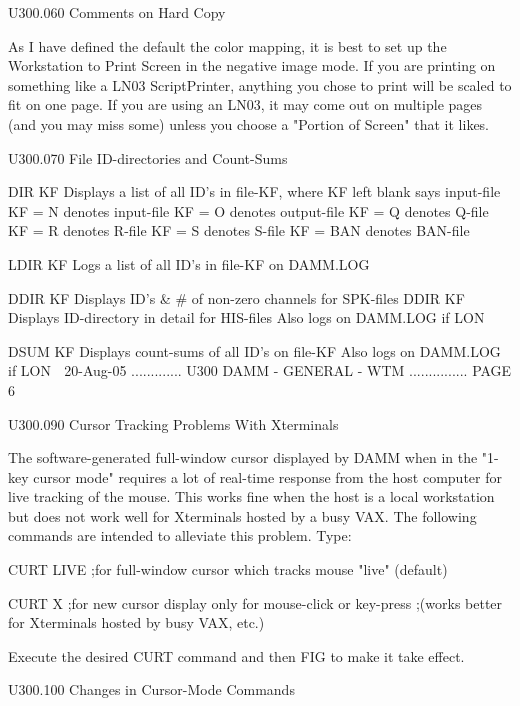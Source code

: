    U300.060  Comments on Hard Copy
 
   As I have defined the default the color mapping, it is best to set  up  the
   Workstation to Print Screen in the negative image mode. If you are printing
   on  something  like  a LN03 ScriptPrinter, anything you chose to print will
   be scaled to fit on one page. If you are using an LN03, it may come out  on
   multiple  pages  (and  you  may  miss some) unless you choose a "Portion of
   Screen" that it likes.
 
   U300.070  File ID-directories and Count-Sums
 
   DIR  KF   Displays a list of all ID's in file-KF, where
             KF   left blank says input-file
             KF = N     denotes   input-file
             KF = O     denotes  output-file
             KF = Q     denotes       Q-file
             KF = R     denotes       R-file
             KF = S     denotes       S-file
             KF = BAN   denotes     BAN-file
 
   LDIR KF   Logs a list of all ID's in file-KF on DAMM.LOG
 
   DDIR KF   Displays ID's & # of non-zero channels for SPK-files
   DDIR KF   Displays ID-directory in detail        for HIS-files
             Also logs on DAMM.LOG if LON
 
   DSUM KF   Displays count-sums of all ID's on file-KF
             Also logs on DAMM.LOG if LON
    
   20-Aug-05 ............. U300  DAMM - GENERAL - WTM ............... PAGE   6
 
   U300.090  Cursor Tracking Problems With Xterminals
 
   The software-generated full-window cursor displayed by  DAMM  when  in  the
   "1-key  cursor  mode"  requires  a  lot of real-time response from the host
   computer for live tracking of the mouse. This works fine when the  host  is
   a  local workstation but does not work well for Xterminals hosted by a busy
   VAX. The following commands are intended to alleviate this problem. Type:
 
   CURT LIVE  ;for full-window cursor which tracks mouse "live" (default)
 
   CURT X     ;for new cursor display only for mouse-click or key-press
              ;(works better for Xterminals hosted by busy VAX, etc.)
 
   Execute the desired CURT command and then FIG to make it take effect.
 
   U300.100  Changes in Cursor-Mode Commands
 
